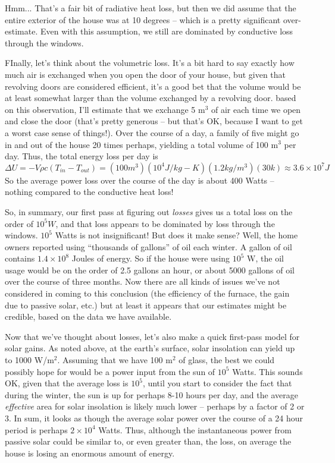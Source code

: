 \documentclass[10pt]{book}
\begin{document}
Hmm...  That's a fair bit of radiative heat loss, but then we did assume that the entire exterior of the house was at 10 degrees -- which is a pretty significant over-estimate.  Even with this assumption, we still are dominated by conductive loss through the windows.

FInally, let's think about the volumetric loss.  It's a bit hard to say exactly how much air is exchanged when you open the door of your house, but given that revolving doors are considered efficient, it's a good bet that the volume would be at least somewhat larger than the volume exchanged by a revolving door.  based on this observation, I'll estimate that we exchange 5 m$^3$ of air each time we open and close the door (that's pretty generous -- but that's OK, because I want to get a worst case sense of things!).  Over the course of a day, a family of five might go in and out of the house 20 times perhaps,  yielding a total volume of 100 m$^3$ per day.  Thus, the total energy loss per day is
$$ \Delta U = - V\rho c (T_{in} - T_{out}) = (100 m^3) (10^4 J/kg-K)(1.2 kg/m^3)(30 k) \approx 3.6 \times 10^7 J$$
So the average power loss over the course of the day is about 400 Watts -- nothing compared to the conductive heat loss!

So, in summary, our first pass at figuring out {\it losses} gives us a total loss on the order of $10^5 W$, and that loss appears to be dominated by loss through the windows.  $10^5$ Watts is not insignificant!  But does it make sense?  Well, the home owners reported using ``thousands of gallons'' of oil each winter.  A gallon of oil contains $1.4\times 10^8$ Joules of energy.  So if the house were using $10^5$ W, the oil usage would be on the order of 2.5 gallons an hour, or about 5000 gallons of oil over the course of three months.  Now there are all kinds of issues we've not considered in coming to this conclusion (the efficiency of the furnace, the gain due to passive solar, etc.) but at least it appears that our estimates might be credible, based on the data we have available.

Now that we've thought about losses, let's also make a quick first-pass model for solar gains.  As noted above, at the earth's surface, solar insolation can yield up to 1000 W/m$^2$.  Assuming that we have 100 m$^2$ of glass, the best we could possibly hope for would be a power input from the sun of $10^5$ Watts.  This sounds OK, given that the average loss is $10^5$, until you start to  consider the fact that during the winter, the sun is up for perhaps 8-10 hours per day, and the average {\it effective} area for solar insolation is likely much lower -- perhaps by a factor of 2 or 3.  In sum, it looks as though the average solar power over the course of a 24 hour period is perhaps $2 \times 10^4$ Watts. Thus, although the instantaneous power from passive solar could be similar to, or even greater than, the loss, on average the house is losing an enormous amount of energy.
\end{document}
